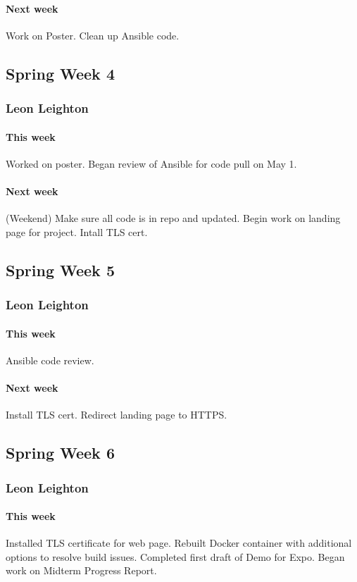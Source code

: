 \documentclass[10pt,letterpaper,onecolumn,draftclsnofoot]{IEEEtran}
\begin{document}
\paragraph{Next week} Work on Poster. Clean up Ansible code.

\subsection{Spring Week 4}
\subsubsection{Leon Leighton}
\paragraph{This week}Worked on poster.  
Began review of Ansible for code pull on May 1.
\paragraph{Next week}(Weekend) Make sure all code is in repo and updated.  
Begin work on landing page for project.  
Intall TLS cert.


\subsection{Spring Week 5}
\subsubsection{Leon Leighton}
\paragraph{This week} Ansible code review.
\paragraph{Next week} Install TLS cert. Redirect landing page to HTTPS.

\subsection{Spring Week 6}
\subsubsection{Leon Leighton}
\paragraph{This week}Installed TLS certificate for web page.  
Rebuilt Docker container with additional options to resolve build issues.  
Completed first draft of Demo for Expo.  
Began work on Midterm Progress Report.
\end{document}
